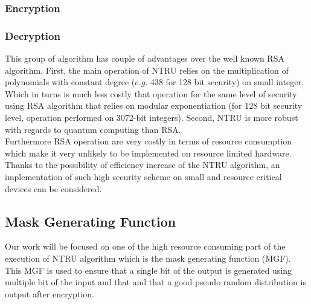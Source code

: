 \subsubsection{Encryption}
\subsubsection{Decryption}

This group of algorithm has couple of advantages over the well known RSA algorithm. First, the main operation of NTRU relies on the multiplication of polynomials with constant degree ($e.g.$ 438 for 128 bit security) on small integer. Which in turns is much less costly that operation for the same level of security using RSA algorithm that relies on modular exponentiation (for 128 bit security level, operation performed on 3072-bit integers). Second, NTRU is more robust with regards to quantum computing than RSA.\\
Furthermore RSA operation are very costly in terms of resource consumption which make it very unlikely to be implemented on resource limited hardware. Thanks to the possibility of efficiency increase of the NTRU algorithm, an implementation of such high security scheme on small and resource critical devices can be considered.
\subsection{Mask Generating Function}
Our work will be focused on one of the high resource consuming part of the execution of NTRU algorithm which is the mask generating function (MGF). This MGF is used to ensure that a single bit of the output is generated using multiple bit of the input and that and that a good pseudo random distribution is output after encryption.\\

